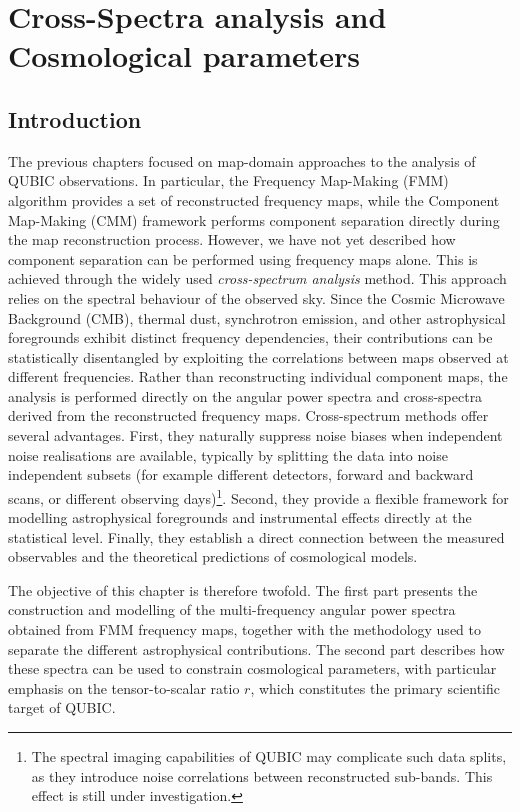 \documentclass[../../thesis.tex]{subfiles}
\begin{document}
 
\chapter[Cross-Spectra Analysis]{Cross-Spectra analysis and Cosmological parameters} \label{chap:xspectrum}

\ifSubfilesClassLoaded{
    \tableofcontents
}{
    \minitoc
}

\section*{Introduction}

The previous chapters focused on map-domain approaches to the analysis of QUBIC observations. In particular, the Frequency Map-Making (FMM) algorithm provides a set of reconstructed frequency maps, while the Component Map-Making (CMM) framework performs component separation directly during the map reconstruction process. However, we have not yet described how component separation can be performed using frequency maps alone. This is achieved through the widely used \emph{cross-spectrum analysis} method.
This approach relies on the spectral behaviour of the observed sky. Since the Cosmic Microwave Background (CMB), thermal dust, synchrotron emission, and other astrophysical foregrounds exhibit distinct frequency dependencies, their contributions can be statistically disentangled by exploiting the correlations between maps observed at different frequencies. Rather than reconstructing individual component maps, the analysis is performed directly on the angular power spectra and cross-spectra derived from the reconstructed frequency maps.
Cross-spectrum methods offer several advantages. First, they naturally suppress noise biases when independent noise realisations are available, typically by splitting the data into noise independent subsets (for example different detectors, forward and backward scans, or different observing days)\footnote{The spectral imaging capabilities of QUBIC may complicate such data splits, as they introduce noise correlations between reconstructed sub-bands. This effect is still under investigation.}. Second, they provide a flexible framework for modelling astrophysical foregrounds and instrumental effects directly at the statistical level. Finally, they establish a direct connection between the measured observables and the theoretical predictions of cosmological models.

The objective of this chapter is therefore twofold. The first part presents the construction and modelling of the multi-frequency angular power spectra obtained from FMM frequency maps, together with the methodology used to separate the different astrophysical contributions. The second part describes how these spectra can be used to constrain cosmological parameters, with particular emphasis on the tensor-to-scalar ratio $r$, which constitutes the primary scientific target of QUBIC. \\
\end{document}
